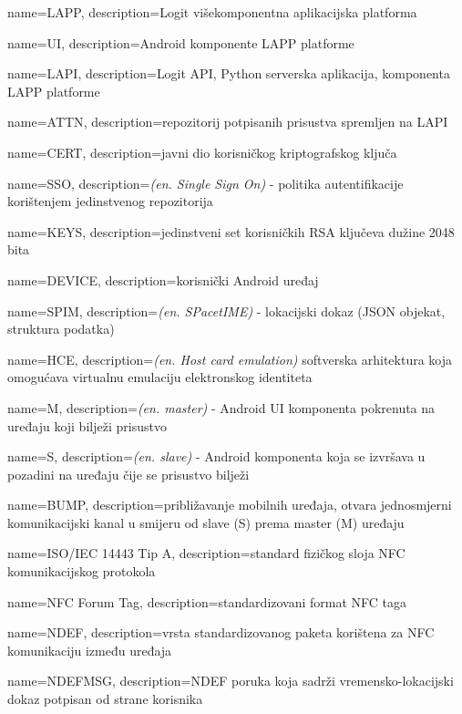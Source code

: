 {name={LAPP}, description={Logit višekomponentna aplikacijska platforma}}

{name={UI}, description={Android komponente LAPP platforme}}

{name={LAPI}, description={Logit API, Python serverska aplikacija, komponenta LAPP platforme}}

{name={ATTN}, description={repozitorij potpisanih prisustva spremljen na LAPI}}

{name={CERT}, description={javni dio korisničkog kriptografskog ključa}}

{name={SSO}, description={\textit{(en. Single Sign On)} - politika autentifikacije korištenjem jedinstvenog repozitorija}}

{name={KEYS}, description={jedinstveni set korisničkih RSA ključeva dužine 2048 bita}}

{name={DEVICE}, description={korisnički Android uređaj}}

{name={SPIM}, description={\textit{(en. SPacetIME)} - lokacijski dokaz (JSON objekat, struktura podatka)}}

{name={HCE}, description={\textit{(en. Host card emulation)} softverska arhitektura koja omogućava virtualnu emulaciju elektronskog identiteta}}

{name={M}, description={\textit{(en. master)} - Android UI komponenta pokrenuta na uređaju koji bilježi prisustvo}}

{name={S}, description={\textit{(en. slave)} - Android komponenta koja se izvršava u pozadini na uređaju čije se prisustvo bilježi}}

{name={BUMP}, description={približavanje mobilnih uređaja, otvara jednosmjerni komunikacijski kanal u smijeru od slave (S) prema master (M) uređaju}}

{name={ISO/IEC 14443 Tip A}, description={standard fizičkog sloja NFC komunikacijskog protokola}}

{name={NFC Forum Tag}, description={standardizovani format NFC taga}}

{name={NDEF}, description={vrsta standardizovanog paketa korištena za NFC komunikaciju između uređaja}}

{name={NDEFMSG}, description={NDEF poruka koja sadrži vremensko-lokacijski dokaz potpisan od strane korisnika}}